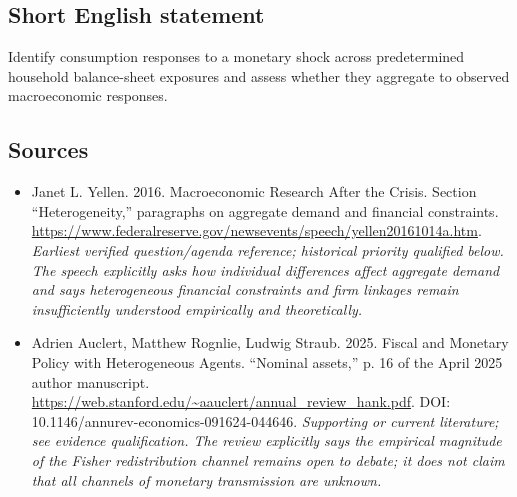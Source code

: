 \documentclass[11pt]{article}
\begin{document}
\subsection{Short English statement}
Identify consumption responses to a monetary shock across predetermined household balance-sheet exposures and assess whether they aggregate to observed macroeconomic responses.

\subsection{Sources}
\begin{itemize}\raggedright
\item[\textnormal{[S1]}]\hypertarget{source:30007525:1}{} Janet L. Yellen. 2016. Macroeconomic Research After the Crisis. Section “Heterogeneity,” paragraphs on aggregate demand and financial constraints.
\url{https://www.federalreserve.gov/newsevents/speech/yellen20161014a.htm}.
{\small\textit{Earliest verified question/agenda reference; historical priority qualified below. The speech explicitly asks how individual differences affect aggregate demand and says heterogeneous financial constraints and firm linkages remain insufficiently understood empirically and theoretically.}}

\item[\textnormal{[S2]}]\hypertarget{source:30007525:2}{} Adrien Auclert, Matthew Rognlie, Ludwig Straub. 2025. Fiscal and Monetary Policy with Heterogeneous Agents. “Nominal assets,” p. 16 of the April 2025 author manuscript.
\url{https://web.stanford.edu/~aauclert/annual_review_hank.pdf}.
DOI: 10.1146/annurev-economics-091624-044646.
{\small\textit{Supporting or current literature; see evidence qualification. The review explicitly says the empirical magnitude of the Fisher redistribution channel remains open to debate; it does not claim that all channels of monetary transmission are unknown.}}
\end{itemize}
\end{document}
